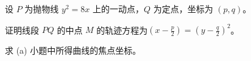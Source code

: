 \documentclass[12pt,a4paper]{exam-zh}
\newcommand{\qscoreoffset}{4em}
\newcommand{\qscore}[1]{%
    \leavevmode\unskip\nobreak\hfill
    \makebox[0pt][l]{\makebox[\qscoreoffset][r]{(#1\%)}}%
}
\begin{document}




\begin{question}[points = 6]
    设 $P$ 为抛物线 $y^2=8x$ 上的一动点，$Q$ 为定点，坐标为 $(p,q)$。

    \begin{questionparts}
        \item 证明线段 $PQ$ 的中点 $M$ 的轨迹方程为$\displaystyle \left(x-\frac{p}{2}\right)=\left(y-\frac{q}{2}\right)^2$。\qscore{3}

        \item 求 (a) 小题中所得曲线的焦点坐标。 \qscore{3}
    \end{questionparts}
\end{question}
\end{document}
